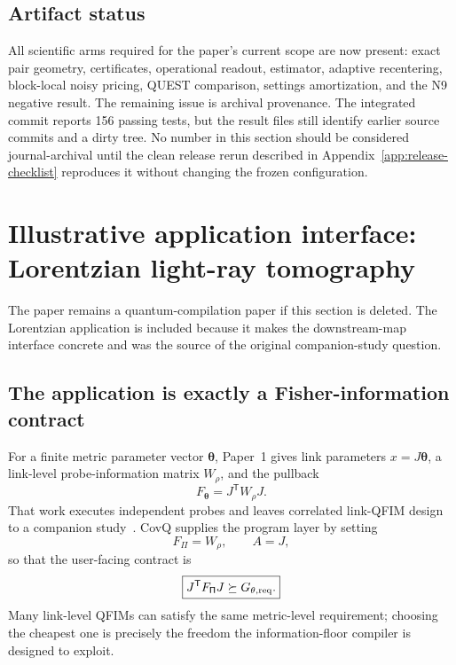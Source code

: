 \documentclass[11pt]{article}
\theoremstyle{definition}
\theoremstyle{remark}
\newcommand{\PiProg}{\mathsf{\Pi}}
\begin{document}
\subsection{Artifact status}
All scientific arms required for the paper's current scope are now present: exact pair geometry, certificates, operational readout, estimator, adaptive recentering, block-local noisy pricing, QUEST comparison, settings amortization, and the N9 negative result. The remaining issue is archival provenance. The integrated commit reports 156 passing tests, but the result files still identify earlier source commits and a dirty tree. No number in this section should be considered journal-archival until the clean release rerun described in Appendix~\ref{app:release-checklist} reproduces it without changing the frozen configuration.


\section{Illustrative application interface: Lorentzian light-ray tomography}
\label{sec:application}

The paper remains a quantum-compilation paper if this section is deleted. The Lorentzian application is included because it makes the downstream-map interface concrete and was the source of the original companion-study question.

\subsection{The application is exactly a Fisher-information contract}
For a finite metric parameter vector $\bm\theta$, Paper~1 gives link parameters $x=J\bm\theta$, a link-level probe-information matrix $W_\rho$, and the pullback
\begin{equation}
  F_{\bm\theta}=J^{\mathsf T}W_\rho J.
  \label{eq:light-ray-pullback}
\end{equation}
That work executes independent probes and leaves correlated link-QFIM design to a companion study~\cite{DixitChauhan2026}. CovQ supplies the program layer by setting
\begin{equation}
  F_{\PiProg}=W_\rho,
  \qquad A=J,
\end{equation}
so that the user-facing contract is
\begin{equation}
\boxed{
  J^{\mathsf T}F_{\PiProg}J\succeq G_{\theta,{\rm req}}.}
  \label{eq:spacetime-floor}
\end{equation}
Many link-level QFIMs can satisfy the same metric-level requirement; choosing the cheapest one is precisely the freedom the information-floor compiler is designed to exploit.
\end{document}
